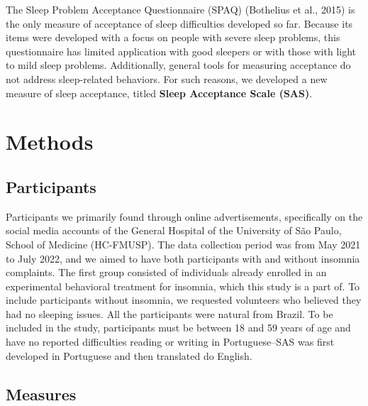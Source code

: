 \documentclass[
  letterpaper,
  DIV=11,
  numbers=noendperiod]{scrreprt}
\begin{document}
The Sleep Problem Acceptance Questionnaire (SPAQ) (Bothelius et al.,
2015) is the only measure of acceptance of sleep difficulties developed
so far. Because its items were developed with a focus on people with
severe sleep problems, this questionnaire has limited application with
good sleepers or with those with light to mild sleep problems.
Additionally, general tools for measuring acceptance do not address
sleep-related behaviors. For such reasons, we developed a new measure of
sleep acceptance, titled \textbf{Sleep Acceptance Scale (SAS)}.

\hypertarget{methods}{%
\section{Methods}\label{methods}}

\hypertarget{participants}{%
\subsection{Participants}\label{participants}}

Participants we primarily found through online advertisements,
specifically on the social media accounts of the General Hospital of the
University of São Paulo, School of Medicine (HC-FMUSP). The data
collection period was from May 2021 to July 2022, and we aimed to have
both participants with and without insomnia complaints. The first group
consisted of individuals already enrolled in an experimental behavioral
treatment for insomnia, which this study is a part of. To include
participants without insomnia, we requested volunteers who believed they
had no sleeping issues. All the participants were natural from Brazil.
To be included in the study, participants must be between 18 and 59
years of age and have no reported difficulties reading or writing in
Portuguese--SAS was first developed in Portuguese and then translated do
English.

\hypertarget{measures}{%
\subsection{Measures}\label{measures}}
\end{document}
